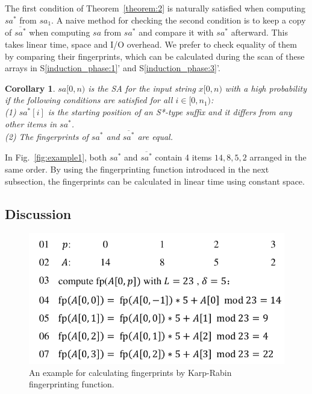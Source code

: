 \documentclass[10pt,journal,compsoc]{IEEEtran}
\newtheorem{corollary}[theorem]{Corollary}
\begin{document}
The first condition of Theorem~\ref{theorem:2} is naturally satisfied when computing $sa^*$ from $sa_1$. A naive method for checking the second condition is to keep a copy of $\overline{sa^*}$ when computing $sa$ from $sa^*$ and compare it with $sa^*$ afterward. This takes linear time, space and I/O overhead. We prefer to check equality of them by comparing their fingerprints, which can be calculated during the scan of these arrays in S\ref{induction_phase:1}' and S\ref{induction_phase:3}'. 

\begin{corollary} \label{corollary:2}
	$sa[0, n)$ is the SA for the input string $x[0, n)$ with a high probability if the following conditions are satisfied for all $i \in [0, n_1)$: \\
	(1) $sa^*[i]$ is the starting position of an S*-type suffix and it differs from any other items in $sa^*$. \\
	(2) The fingerprints of $sa^*$ and $\overline{sa^*}$ are equal. \\
\end{corollary}

In Fig.~\ref{fig:example1}, both $sa^*$ and $\overline{sa^*}$ contain 4 items $14, 8, 5, 2$ arranged in the same order. By using the fingerprinting function introduced in the next subsection, the fingerprints can be calculated in linear time using constant space. 

\subsection{Discussion}

\begin{figure}[htbp!]
	\centering
	
	\includegraphics[width = 0.9\columnwidth]{example2.pdf}
	
	\caption{An example for calculating fingerprints by Karp-Rabin fingerprinting function.}
	
	\label{fig:example2}
	
\end{figure}
\end{document}

